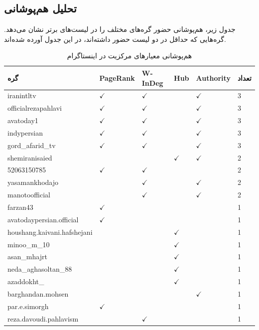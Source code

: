 \documentclass{article}
\begin{document}
	
	\subsection{تحلیل هم‌پوشانی}
	جدول زیر، هم‌پوشانی حضور گره‌های مختلف را در لیست‌های برتر نشان می‌دهد. گره‌هایی که حداقل در دو لیست حضور داشته‌اند، در این جدول آورده شده‌اند.
	
	\begin{table}[h!]
		\centering
		\caption{هم‌پوشانی معیارهای مرکزیت در اینستاگرام}
		\label{tab:instagram_overlap}
		\begin{tabular}{@{}llllll@{}}
			\toprule
			\textbf{گره} & \textbf{PageRank} & \textbf{W-InDeg} & \textbf{Hub} & \textbf{Authority} & \textbf{تعداد} \\ \midrule
			iranintltv & $\checkmark$ & $\checkmark$ &  & $\checkmark$ & 3 \\
			officialrezapahlavi & $\checkmark$ & $\checkmark$ &  & $\checkmark$ & 3 \\
			avatoday1 & $\checkmark$ & $\checkmark$ &  & $\checkmark$ & 3 \\
			indypersian & $\checkmark$ & $\checkmark$ &  & $\checkmark$ & 3 \\
			gord\_afarid\_tv & $\checkmark$ & $\checkmark$ &  & $\checkmark$ & 3 \\
			shemiranisaied &  &  & $\checkmark$ & $\checkmark$ & 2 \\
			52063150785 & $\checkmark$ & $\checkmark$ &  &  & 2 \\
			yasamankhodajo &  & $\checkmark$ &  & $\checkmark$ & 2 \\
			manotoofficial &  & $\checkmark$ &  & $\checkmark$ & 2 \\
			farzan43 & $\checkmark$ &  &  &  & 1 \\
			avatodaypersian.official & $\checkmark$ &  &  &  & 1 \\
			houshang.kaivani.hafshejani &  &  & $\checkmark$ &  & 1 \\
			minoo\_m\_10 &  &  & $\checkmark$ &  & 1 \\
			asan\_mhajrt &  &  & $\checkmark$ &  & 1 \\
			neda\_aghasoltan\_88 &  &  & $\checkmark$ &  & 1 \\
			azaddokht\_ &  &  & $\checkmark$ &  & 1 \\
			barghandan.mohsen &  &  &  & $\checkmark$ & 1 \\
			par.e.simorgh & $\checkmark$ &  &  &  & 1 \\
			reza.davoudi.pahlavism &  & $\checkmark$ &  &  & 1 \\

\end{tabular}
\end{table}
\end{document}
